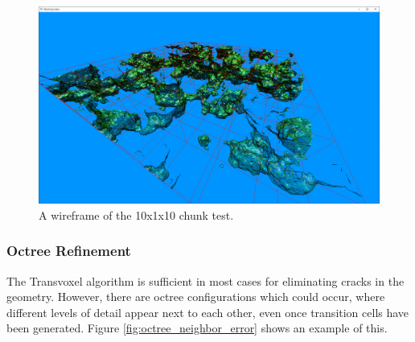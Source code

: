 \documentclass[11pt]{article}
\begin{document}
\begin{figure}[H]
  \includegraphics[width=\textwidth]{10x10_wireframe.png}
  \caption{A wireframe of the 10x1x10 chunk test.}
\end{figure}


\subsubsection{Octree Refinement}
\label{section:octree_refinement}
The Transvoxel algorithm is sufficient in most cases for eliminating cracks in the geometry. However, there are octree configurations which could occur, where different levels of detail appear next to each other, even once transition cells have been generated. Figure \ref{fig:octree_neighbor_error} shows an example of this.
\end{document}
